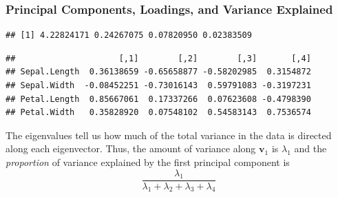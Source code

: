 \documentclass[
]{article}
\newenvironment{Shaded}{\begin{snugshade}}{\end{snugshade}}
\newcommand{\AttributeTok}[1]{\textcolor[rgb]{0.77,0.63,0.00}{#1}}
\newcommand{\ConstantTok}[1]{\textcolor[rgb]{0.00,0.00,0.00}{#1}}
\newcommand{\DecValTok}[1]{\textcolor[rgb]{0.00,0.00,0.81}{#1}}
\newcommand{\FunctionTok}[1]{\textcolor[rgb]{0.00,0.00,0.00}{#1}}
\newcommand{\NormalTok}[1]{#1}
\newcommand{\OtherTok}[1]{\textcolor[rgb]{0.56,0.35,0.01}{#1}}
\newcommand{\SpecialCharTok}[1]{\textcolor[rgb]{0.00,0.00,0.00}{#1}}
\theoremstyle{definition}
\theoremstyle{definition}
\theoremstyle{definition}
\theoremstyle{definition}
\theoremstyle{remark}
\begin{document}
\hypertarget{principal-components-loadings-and-variance-explained}{%
\subsubsection{Principal Components, Loadings, and Variance Explained}\label{principal-components-loadings-and-variance-explained}}

\begin{Shaded}
\end{Shaded}

\begin{verbatim}
## [1] 4.22824171 0.24267075 0.07820950 0.02383509
\end{verbatim}

\begin{Shaded}
\end{Shaded}

\begin{verbatim}
##                     [,1]        [,2]        [,3]       [,4]
## Sepal.Length  0.36138659 -0.65658877 -0.58202985  0.3154872
## Sepal.Width  -0.08452251 -0.73016143  0.59791083 -0.3197231
## Petal.Length  0.85667061  0.17337266  0.07623608 -0.4798390
## Petal.Width   0.35828920  0.07548102  0.54583143  0.7536574
\end{verbatim}

The eigenvalues tell us how much of the total variance in the data is directed along each eigenvector. Thus, the amount of variance along \(\mathbf{v}_1\) is \(\lambda_1\) and the \emph{proportion} of variance explained by the first principal component is
\[\frac{\lambda_1}{\lambda_1+\lambda_2+\lambda_3+\lambda_4}\]
\end{document}
